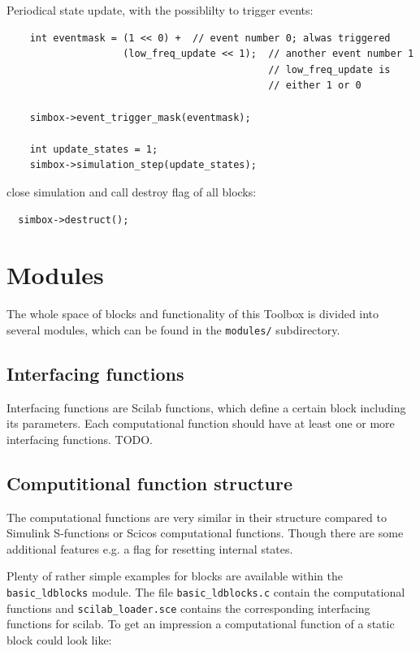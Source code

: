 \documentclass[%
	pdftex,%
	a4paper,%
	oneside,%
	11pt,%
	halfparskip,%
	headsepline,%
	bibtotocnumbered,%
	idxtotoc%
]{scrartcl}
\begin{document}
Periodical state update, with the possiblilty to trigger events:

\begin{verbatim}
    int eventmask = (1 << 0) +  // event number 0; alwas triggered
                    (low_freq_update << 1);  // another event number 1 
                                             // low_freq_update is 
                                             // either 1 or 0

    simbox->event_trigger_mask(eventmask);
    
    int update_states = 1;
    simbox->simulation_step(update_states); 
\end{verbatim}

close simulation and call destroy flag of all blocks:

\begin{verbatim}
  simbox->destruct();
\end{verbatim}

\section{Modules}

The whole space of blocks and functionality of this Toolbox is divided into several modules, which can be found in the \texttt{modules/} subdirectory.

\subsection{Interfacing functions}

Interfacing functions are Scilab functions, which define a certain block including its parameters. Each computational function should have at least one or more interfacing functions. TODO.

\subsection{Computitional function structure}

The computational functions are very similar in their structure compared to Simulink S-functions or Scicos computational functions. Though there are some additional features e.g. a flag for resetting internal states.

Plenty of rather simple examples for blocks are available within the \texttt{basic\_ldblocks} module. The file \texttt{basic\_ldblocks.c} contain the computational functions  and \texttt{scilab\_loader.sce} contains the corresponding interfacing functions for scilab.
To get an impression a computational function of a static block could look like:
\end{document}

